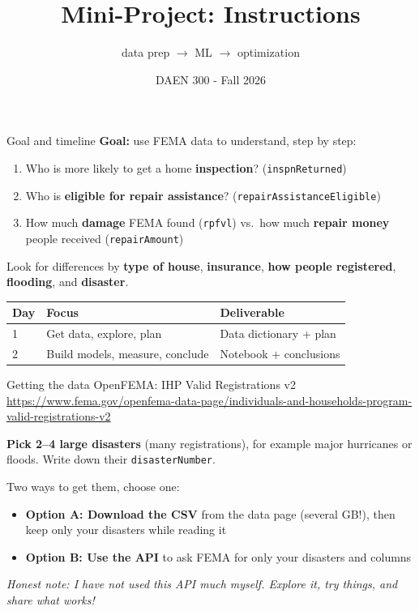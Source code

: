 \documentclass[aspectratio=43,11pt]{beamer}
\title{Mini-Project: Instructions}
\subtitle{data prep $\rightarrow$ ML $\rightarrow$ optimization}
\author{DAEN 300 - Fall 2026}
\date{}
\begin{document}
\begin{frame}
  \titlepage
\end{frame}

\begin{frame}{Goal and timeline}
  \textbf{Goal:} use FEMA data to understand, step by step:
  \begin{enumerate}
    \item Who is more likely to get a home \textbf{inspection}? (\texttt{inspnReturned})
    \item Who is \textbf{eligible for repair assistance}? (\texttt{repairAssistanceEligible})
    \item How much \textbf{damage} FEMA found (\texttt{rpfvl}) vs.\ how much
          \textbf{repair money} people received (\texttt{repairAmount})
  \end{enumerate}
  \vspace{0.3em}
  Look for differences by \textbf{type of house}, \textbf{insurance},
  \textbf{how people registered}, \textbf{flooding}, and \textbf{disaster}.
  \vspace{0.6em}
  \begin{center}
  \begin{tabular}{@{}lll@{}}
    \toprule
    Day & Focus & Deliverable \\
    \midrule
    1 & Get data, explore, plan & Data dictionary + plan \\
    2 & Build models, measure, conclude & Notebook + conclusions \\
    \bottomrule
  \end{tabular}
  \end{center}
\end{frame}

\begin{frame}{Getting the data}
  OpenFEMA: IHP Valid Registrations v2 \\
  {\tiny\url{https://www.fema.gov/openfema-data-page/individuals-and-households-program-valid-registrations-v2}}

  \vspace{0.8em}
  \textbf{Pick 2--4 large disasters} (many registrations), for example major
  hurricanes or floods. Write down their \texttt{disasterNumber}.

  \vspace{0.8em}
  Two ways to get them, choose one:
  \begin{itemize}
    \item \textbf{Option A: Download the CSV} from the data page
          (several GB!), then keep only your disasters while reading it
    \item \textbf{Option B: Use the API} to ask FEMA for only your
          disasters and columns
  \end{itemize}

  \vspace{0.8em}
  \small\emph{Honest note: I have not used this API much myself.
  Explore it, try things, and share what works!}
\end{frame}
\end{document}
